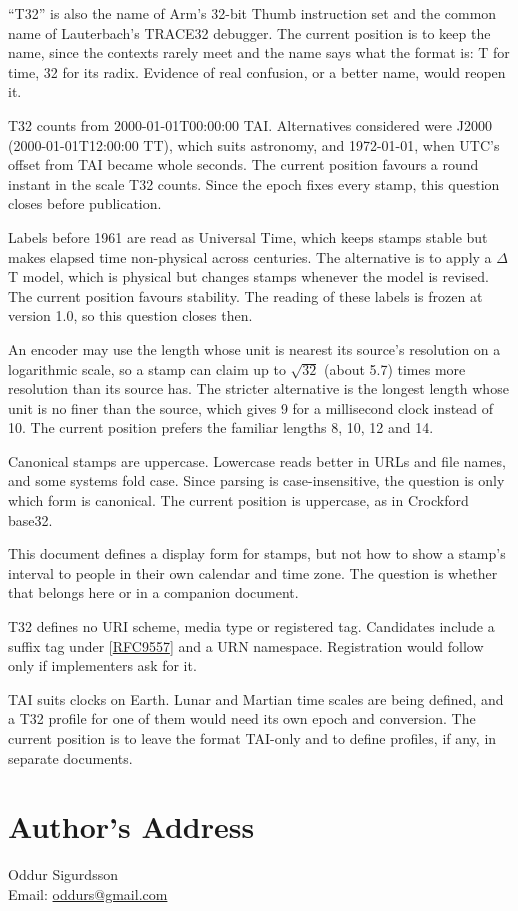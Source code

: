 \documentclass[11pt]{article}
\newcommand{\xref}[1]{[\hyperref[ref:#1]{#1}]}
\begin{document}
\begin{description}[style=nextline,leftmargin=1.5em]
\item[The name] ``T32'' is also the name of Arm's 32-bit Thumb instruction set
and the common name of Lauterbach's TRACE32 debugger. The current position is
to keep the name, since the contexts rarely meet and the name says what the
format is: T for time, 32 for its radix. Evidence of real confusion, or a
better name, would reopen it.
\item[The epoch] T32 counts from 2000-01-01T00:00:00 TAI. Alternatives
considered were J2000 (2000-01-01T12:00:00 TT), which suits astronomy, and
1972-01-01, when UTC's offset from TAI became whole seconds. The current
position favours a round instant in the scale T32 counts. Since the epoch
fixes every stamp, this question closes before publication.
\item[Before 1961] Labels before 1961 are read as Universal Time, which keeps
stamps stable but makes elapsed time non-physical across centuries. The
alternative is to apply a $\Delta$T model, which is physical but changes
stamps whenever the model is revised. The current position favours stability.
The reading of these labels is frozen at version 1.0, so this question closes
then.
\item[The resolution rule] An encoder may use the length whose unit is nearest
its source's resolution on a logarithmic scale, so a stamp can claim up to
$\sqrt{32}$ (about 5.7) times more resolution than its source has. The
stricter alternative is the longest length whose unit is no finer than the
source, which gives 9 for a millisecond clock instead of 10. The current
position prefers the familiar lengths 8, 10, 12 and 14.
\item[Letter case] Canonical stamps are uppercase. Lowercase reads better in
URLs and file names, and some systems fold case. Since parsing is
case-insensitive, the question is only which form is canonical. The current
position is uppercase, as in Crockford base32.
\item[A human rendering] This document defines a display form for stamps, but
not how to show a stamp's interval to people in their own calendar and time
zone. The question is whether that belongs here or in a companion document.
\item[Identifiers and registration] T32 defines no URI scheme, media type or
registered tag. Candidates include a suffix tag under \xref{RFC9557} and a URN
namespace. Registration would follow only if implementers ask for it.
\item[Other time scales] TAI suits clocks on Earth. Lunar and Martian time
scales are being defined, and a T32 profile for one of them would need its own
epoch and conversion. The current position is to leave the format TAI-only and
to define profiles, if any, in separate documents.
\end{description}

\section*{Author's Address}

Oddur Sigurdsson\\
Email: \href{mailto:oddurs@gmail.com}{oddurs@gmail.com}
\end{document}
